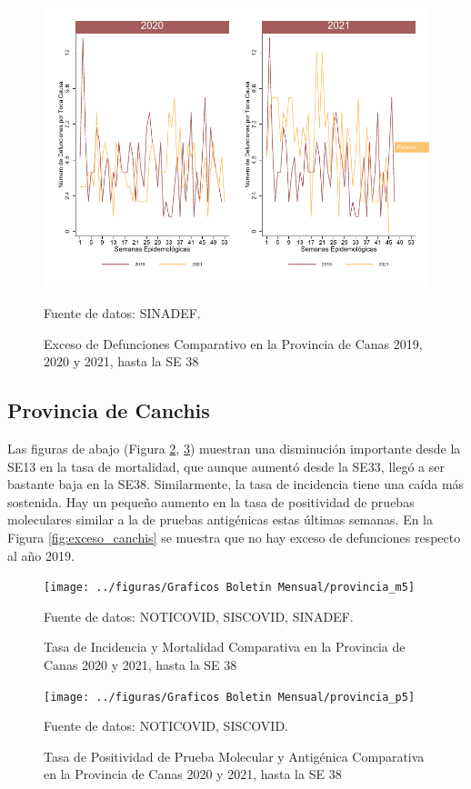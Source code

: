 \documentclass[12pt,a4paper,openany]{book}
\begin{document}
	\begin{figure}[h]
	\caption{Exceso de Defunciones Comparativo en la Provincia de Canas 2019, 2020 y 2021, hasta la SE 38}\label{fig:exceso_calca}
	\begin{center}
		\includegraphics[width=0.7\linewidth]{../figuras/exceso_4}
	\end{center}
	{\footnotesize {Fuente de datos: SINADEF.}}
	\end{figure}

\clearpage

	\subsection*{Provincia de Canchis}
	\noindent Las figuras de abajo (Figura \ref{fig:inc_mort_canchis}, \ref{fig:positividad_canchis})  muestran una disminución importante desde la SE13 en la tasa de mortalidad, que aunque aumentó desde la SE33, llegó a ser bastante baja en la SE38. Similarmente, la tasa de incidencia tiene una caída más sostenida. Hay un pequeño aumento en la tasa de positividad de pruebas moleculares similar a la de pruebas antigénicas estas últimas semanas. En la Figura \ref{fig:exceso_canchis} se muestra que no hay exceso de defunciones respecto al año 2019.

	\begin{figure}[h]
	\caption{Tasa de Incidencia y Mortalidad Comparativa en la Provincia de Canas 2020 y 2021, hasta la SE 38}\label{fig:inc_mort_canchis}
	\begin{center}
		\texttt{[image: ../figuras/Graficos Boletin Mensual/provincia\_m5]}
	\end{center}
	{\footnotesize {Fuente de datos: NOTICOVID, SISCOVID, SINADEF.}}
	\end{figure}

	\begin{figure}[h]
	\caption{Tasa de Positividad de Prueba Molecular y Antigénica Comparativa en la Provincia de Canas 2020 y 2021, hasta la SE 38}\label{fig:positividad_canchis}
	\begin{center}
		\texttt{[image: ../figuras/Graficos Boletin Mensual/provincia\_p5]}
	\end{center}
	{\footnotesize {Fuente de datos: NOTICOVID, SISCOVID.}}
	\end{figure}
	
\end{document}

